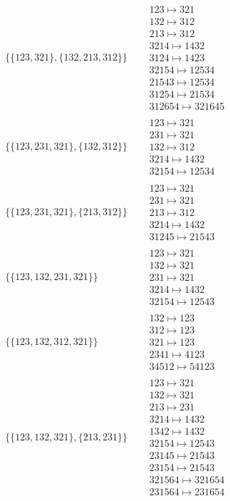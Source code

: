 \begin{tiny}
\begin{align}
\{\{123, 321\}, \{132, 213, 312\}\}
\quad
&
\begin{matrix}
123 \mapsto 321\\132 \mapsto 312\\213 \mapsto 312\\3214 \mapsto 1432\\3124 \mapsto 1423\\32154 \mapsto 12534\\21543 \mapsto 12534\\31254 \mapsto 21534\\312654 \mapsto 321645
\end{matrix}
\\
\{\{123, 231, 321\}, \{132, 312\}\}
\quad
&
\begin{matrix}
123 \mapsto 321\\231 \mapsto 321\\132 \mapsto 312\\3214 \mapsto 1432\\32154 \mapsto 12534
\end{matrix}
\\
\{\{123, 231, 321\}, \{213, 312\}\}
\quad
&
\begin{matrix}
123 \mapsto 321\\231 \mapsto 321\\213 \mapsto 312\\3214 \mapsto 1432\\31245 \mapsto 21543
\end{matrix}
\\
\{\{123, 132, 231, 321\}\}
\quad
&
\begin{matrix}
123 \mapsto 321\\132 \mapsto 321\\231 \mapsto 321\\3214 \mapsto 1432\\32154 \mapsto 12543
\end{matrix}
\\
\{\{123, 132, 312, 321\}\}
\quad
&
\begin{matrix}
132 \mapsto 123\\312 \mapsto 123\\321 \mapsto 123\\2341 \mapsto 4123\\34512 \mapsto 54123
\end{matrix}
\\
\{\{123, 132, 321\}, \{213, 231\}\}
\quad
&
\begin{matrix}
123 \mapsto 321\\132 \mapsto 321\\213 \mapsto 231\\3214 \mapsto 1432\\1342 \mapsto 1432\\32154 \mapsto 12543\\23145 \mapsto 21543\\23154 \mapsto 21543\\321564 \mapsto 321654\\231564 \mapsto 231654

\end{matrix}
\end{align}
\end{tiny}
